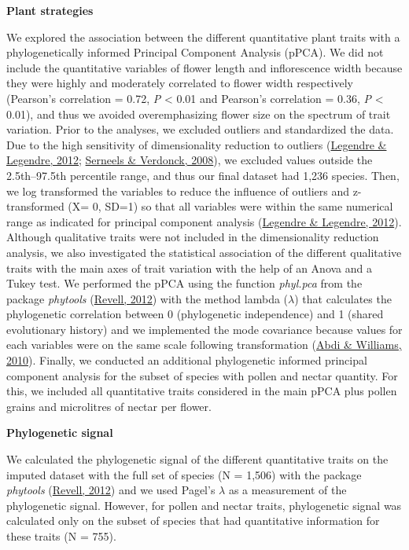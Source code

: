 \documentclass[
  12pt,
  a4paper,
]{article}
\begin{document}
\textbf{Plant strategies}

We explored the association between the different quantitative plant traits with a phylogenetically informed Principal Component Analysis (pPCA). We did not include the quantitative variables of flower length and inflorescence width because they were highly and moderately correlated to flower width respectively (Pearson's correlation = 0.72, \emph{P} \textless{} 0.01 and Pearson's correlation = 0.36, \emph{P} \textless{} 0.01), and thus we avoided overemphasizing flower size on the spectrum of trait variation. Prior to the analyses, we excluded outliers and standardized the data. Due to the high sensitivity of dimensionality reduction to outliers (\protect\hyperlink{ref-legendre2012}{Legendre \& Legendre, 2012}; \protect\hyperlink{ref-serneels2008}{Serneels \& Verdonck, 2008}), we excluded values outside the 2.5th--97.5th percentile range, and thus our final dataset had 1,236 species. Then, we log transformed the variables to reduce the influence of outliers and z-transformed (X= 0, SD=1) so that all variables were within the same numerical range as indicated for principal component analysis (\protect\hyperlink{ref-legendre2012}{Legendre \& Legendre, 2012}). Although qualitative traits were not included in the dimensionality reduction analysis, we also investigated the statistical association of the different qualitative traits with the main axes of trait variation with the help of an Anova and a Tukey test. We performed the pPCA using the function \emph{phyl.pca} from the package \emph{phytools} (\protect\hyperlink{ref-revell2012}{Revell, 2012}) with the method lambda (\(\lambda\)) that calculates the phylogenetic correlation between 0 (phylogenetic independence) and 1 (shared evolutionary history) and we implemented the mode covariance because values for each variables were on the same scale following transformation (\protect\hyperlink{ref-abdi2010}{Abdi \& Williams, 2010}). Finally, we conducted an additional phylogenetic informed principal component analysis for the subset of species with pollen and nectar quantity. For this, we included all quantitative traits considered in the main pPCA plus pollen grains and microlitres of nectar per flower.

\textbf{Phylogenetic signal}

We calculated the phylogenetic signal of the different quantitative traits on the imputed dataset with the full set of species (N = 1,506) with the package \emph{phytools} (\protect\hyperlink{ref-revell2012}{Revell, 2012}) and we used Pagel's \(\lambda\) as a measurement of the phylogenetic signal. However, for pollen and nectar traits, phylogenetic signal was calculated only on the subset of species that had quantitative information for these traits (N = 755).
\end{document}
